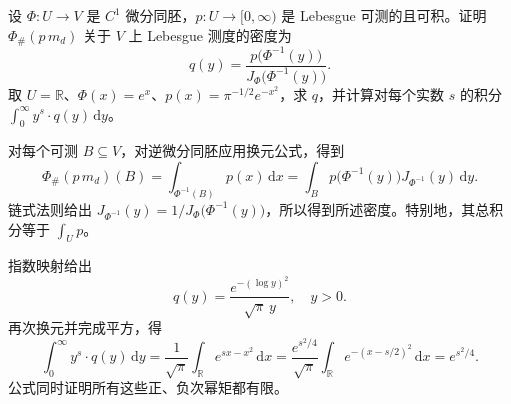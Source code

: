 \begin{exercise}\label{b1:ex:07-pushforward-density}
设 \(\Phi:U\rightarrow V\) 是 \(C^1\) 微分同胚，\(p:U\rightarrow[0,\infty)\) 是 Lebesgue 可测的且可积。证明 \(\Phi_\#(p\,m_d)\) 关于 \(V\) 上 Lebesgue 测度的密度为
\[
q(y)=\frac{p\bigl(\Phi^{-1}(y)\bigr)}{J_\Phi\bigl(\Phi^{-1}(y)\bigr)}.
\]
取 \(U=\mathbb R\)、\(\Phi(x)=e^x\)、\(p(x)=\pi^{-1/2}e^{-x^2}\)，求 \(q\)，并计算对每个实数 \(s\) 的积分 \(\int_0^\infty y^s\cdot q(y)\,\mathrm{d}y\)。
\end{exercise}
\begin{solution}
对每个可测 \(B\subseteq V\)，对逆微分同胚应用换元公式，得到
\[
\Phi_\#(p\,m_d)(B)
=\int_{\Phi^{-1}(B)}p(x)\,\mathrm{d}x
=\int_Bp\bigl(\Phi^{-1}(y)\bigr)J_{\Phi^{-1}}(y)\,\mathrm{d}y.
\]
链式法则给出 \(J_{\Phi^{-1}}(y)=1/J_\Phi\bigl(\Phi^{-1}(y)\bigr)\)，所以得到所述密度。特别地，其总积分等于 \(\int_Up\)。

指数映射给出
\[
q(y)=\frac{e^{-(\log y)^2}}{\sqrt\pi\,y},\quad y>0.
\]
再次换元并完成平方，得
\[
\int_0^\infty y^s\cdot q(y)\,\mathrm{d}y
=\frac1{\sqrt\pi}\int_{\mathbb R}e^{sx-x^2}\,\mathrm{d}x
=\frac{e^{s^2/4}}{\sqrt\pi}\int_{\mathbb R}e^{-(x-s/2)^2}\,\mathrm{d}x
=e^{s^2/4}.
\]
公式同时证明所有这些正、负次幂矩都有限。
\end{solution}

